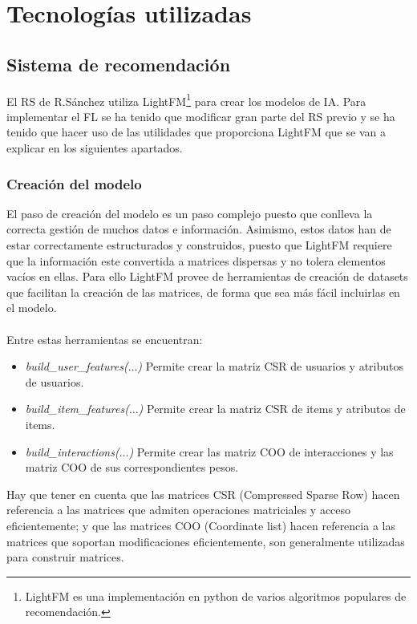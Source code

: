 \section{Tecnologías utilizadas}

\subsection{Sistema de recomendación}
El RS de R.Sánchez utiliza LightFM\footnote{LightFM es una implementación en python de varios algoritmos populares de recomendación.} para crear los modelos de IA. Para implementar el FL se ha tenido que modificar gran parte del RS previo y se ha tenido que hacer uso de las utilidades que proporciona LightFM que se van a explicar en los siguientes apartados. 
\subsubsection{Creación del modelo}
El paso de creación del modelo es un paso complejo puesto que conlleva la correcta gestión de muchos datos e información. Asimismo, estos datos han de estar correctamente estructurados y construidos, puesto que LightFM requiere que la información este convertida a matrices dispersas y no tolera elementos vacíos en ellas. Para ello LightFM provee de herramientas de creación de datasets que facilitan la creación de las matrices, de forma que sea más fácil incluirlas en el modelo. 
\\ \\
Entre estas herramientas se encuentran:

\begin{itemize}
    \item \textit{build\_user\_features($\ldots$)} \quad Permite crear la matriz CSR de usuarios y atributos de usuarios.
    \item \textit{build\_item\_features($\ldots$)} \quad Permite crear la matriz CSR  de items y atributos de items.
    \item \textit{build\_interactions($\ldots$)} \quad Permite crear las matriz COO de interacciones y las matriz COO de sus correspondientes pesos.
\end{itemize}

Hay que tener en cuenta que las matrices CSR (Compressed Sparse Row) hacen referencia a las matrices que admiten operaciones matriciales y acceso eficientemente; y que las matrices COO (Coordinate list) hacen referencia a las matrices que soportan modificaciones eficientemente, son generalmente utilizadas para construir matrices.


